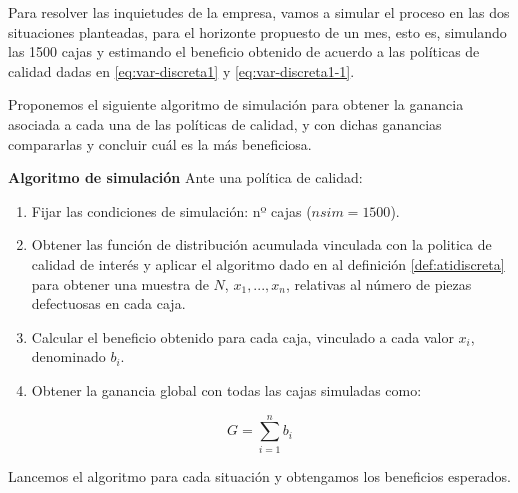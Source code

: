 \documentclass[
]{book}
\providecommand{\tightlist}{%
  \setlength{\itemsep}{0pt}\setlength{\parskip}{0pt}}
\newenvironment{silverbox}{
  \definecolor{shadecolor}{rgb}{192, 192, 192}  
  \color{black}
  \begin{shaded}}
 {\end{shaded}}
\theoremstyle{definition}
\theoremstyle{definition}
\theoremstyle{definition}
\theoremstyle{definition}
\theoremstyle{remark}
\begin{document}
Para resolver las inquietudes de la empresa, vamos a simular el proceso en las dos situaciones planteadas, para el horizonte propuesto de un mes, esto es, simulando las 1500 cajas y estimando el beneficio obtenido de acuerdo a las políticas de calidad dadas en \eqref{eq:var-discreta1} y \eqref{eq:var-discreta1-1}.

Proponemos el siguiente algoritmo de simulación para obtener la ganancia asociada a cada una de las políticas de calidad, y con dichas ganancias compararlas y concluir cuál es la más beneficiosa.

\begin{silverbox}
\textbf{Algoritmo de simulación} Ante una política de calidad:

\begin{enumerate}
\def\labelenumi{\arabic{enumi}.}
\tightlist
\item
  Fijar las condiciones de simulación: nº cajas (\(nsim = 1500\)).
\item
  Obtener las función de distribución acumulada vinculada con la politica de calidad de interés y aplicar el algoritmo dado en al definición \ref{def:atidiscreta} para obtener una muestra de \(N\), \(x_1,...,x_n\), relativas al número de piezas defectuosas en cada caja.
\item
  Calcular el beneficio obtenido para cada caja, vinculado a cada valor \(x_i\), denominado \(b_i\).
\item
  Obtener la ganancia global con todas las cajas simuladas como:
\end{enumerate}

\[G = \sum_{i=1}^n b_i\]

\end{silverbox}

Lancemos el algoritmo para cada situación y obtengamos los beneficios esperados.
\end{document}
